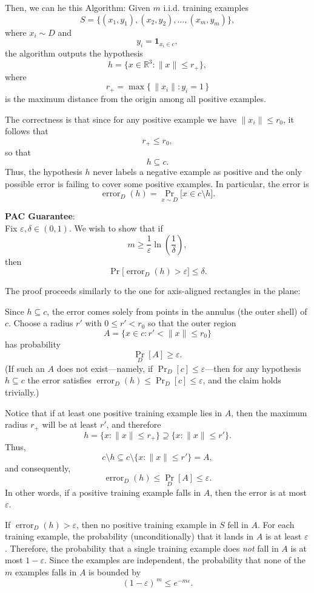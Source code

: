 \documentclass[letterpaper, 11pt]{article}
\newcommand{\1}{\mathds{1}}	%
\theoremstyle{definition}
\begin{document}
Then, we can he this Algorithm: Given \(m\) i.i.d. training examples
\[
S = \{(x_1, y_1), (x_2, y_2), \ldots, (x_m, y_m)\},
\]
where \(x_i \sim D\) and
\[
y_i = \mathbf{1}_{x_i \in c},
\]
the algorithm outputs the hypothesis
\[
h = \{ x \in \mathbb{R}^3 : \|x\| \le r_+\},
\]
where
\[
r_+ = \max\{\, \|x_i\| : y_i = 1 \,\}
\]
is the maximum distance from the origin among all positive examples.

The correctness is that since for any positive example we have \(\|x_i\| \le r_0\), it follows that
\[
r_+ \le r_0,
\]
so that
\[
h \subseteq c.
\]
Thus, the hypothesis \(h\) never labels a negative example as positive and the only possible error is failing to cover some positive examples. In particular, the error is
\[
\operatorname{error}_D(h) = \Pr_{x \sim D}\big[x \in c \setminus h\big].
\]

\textbf{PAC Guarantee}:\\
Fix \(\varepsilon,\delta \in (0,1)\). We wish to show that if
\[
m \ge \frac{1}{\varepsilon}\ln\!\left(\frac{1}{\delta}\right),
\]
then
\[
\Pr\big[\operatorname{error}_D(h) > \varepsilon\big] \le \delta.
\]

The proof proceeds similarly to the one for axis-aligned rectangles in the plane:

Since \(h \subseteq c\), the error comes solely from points in the annulus (the outer shell) of \(c\). Choose a radius \(r'\) with \(0 \le r' < r_0\) so that the outer region
\[
A = \{x \in c: r' < \|x\| \le r_0\}
\]
has probability
\[
\Pr_D[A] \ge \varepsilon.
\]
(If such an \(A\) does not exist—namely, if \(\Pr_D[c] \le \varepsilon\)—then for any hypothesis \(h \subseteq c\) the error satisfies \(\operatorname{error}_D(h) \le \Pr_D[c] \le \varepsilon\), and the claim holds trivially.)

Notice that if at least one positive training example lies in \(A\), then the maximum radius \(r_+\) will be at least \(r'\), and therefore
\[
h = \{x: \|x\| \le r_+\} \supseteq \{x: \|x\| \le r'\}.
\]
Thus,
\[
c \setminus h \subseteq c \setminus \{x: \|x\| \le r'\} = A,
\]
and consequently,
\[
\operatorname{error}_D(h) \le \Pr_D[A] \le \varepsilon.
\]
In other words, if a positive training example falls in \(A\), then the error is at most \(\varepsilon\).

If \(\operatorname{error}_D(h) > \varepsilon\), then no positive training example in \(S\) fell in \(A\). For each training example, the probability (unconditionally) that it lands in \(A\) is at least \(\varepsilon\). Therefore, the probability that a single training example does \emph{not} fall in \(A\) is at most \(1-\varepsilon\). Since the examples are independent, the probability that none of the \(m\) examples falls in \(A\) is bounded by
\[
(1-\varepsilon)^{\,m} \le e^{-m\varepsilon}.
\]
\end{document}
